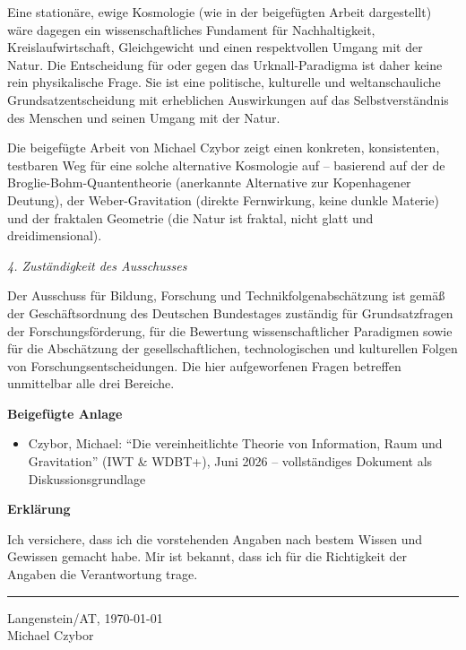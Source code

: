 \documentclass[11pt,a4paper]{letter}
\begin{document}
\begin{letter}
Eine stationäre, ewige Kosmologie (wie in der beigefügten Arbeit dargestellt) wäre dagegen ein wissenschaftliches Fundament für Nachhaltigkeit, Kreislaufwirtschaft, Gleichgewicht und einen respektvollen Umgang mit der Natur. Die Entscheidung für oder gegen das Urknall-Paradigma ist daher keine rein physikalische Frage. Sie ist eine politische, kulturelle und weltanschauliche Grundsatzentscheidung mit erheblichen Auswirkungen auf das Selbstverständnis des Menschen und seinen Umgang mit der Natur.

Die beigefügte Arbeit von Michael Czybor zeigt einen konkreten, konsistenten, testbaren Weg für eine solche alternative Kosmologie auf – basierend auf der de Broglie-Bohm-Quantentheorie (anerkannte Alternative zur Kopenhagener Deutung), der Weber-Gravitation (direkte Fernwirkung, keine dunkle Materie) und der fraktalen Geometrie (die Natur ist fraktal, nicht glatt und dreidimensional).

\vspace{0.2cm}

\noindent
\textit{4. Zuständigkeit des Ausschusses}

Der Ausschuss für Bildung, Forschung und Technikfolgenabschätzung ist gemäß der Geschäftsordnung des Deutschen Bundestages zuständig für Grundsatzfragen der Forschungsförderung, für die Bewertung wissenschaftlicher Paradigmen sowie für die Abschätzung der gesellschaftlichen, technologischen und kulturellen Folgen von Forschungsentscheidungen. Die hier aufgeworfenen Fragen betreffen unmittelbar alle drei Bereiche.

\vspace{0.3cm}

\noindent
\textbf{Beigefügte Anlage}

\begin{itemize}
    \item Czybor, Michael: \enquote{Die vereinheitlichte Theorie von Information, Raum und Gravitation} (IWT \& WDBT+), Juni 2026 – vollständiges Dokument als Diskussionsgrundlage
\end{itemize}

\vspace{0.3cm}

\noindent
\textbf{Erklärung}

Ich versichere, dass ich die vorstehenden Angaben nach bestem Wissen und Gewissen gemacht habe. Mir ist bekannt, dass ich für die Richtigkeit der Angaben die Verantwortung trage.

\vspace{1.5cm}

\begin{flushleft}
    \rule{6cm}{0.4pt}
    
    \vspace{0.2cm}
    
    Langenstein/AT, \today\\Michael Czybor
\end{flushleft}

\end{letter}
\end{document}
